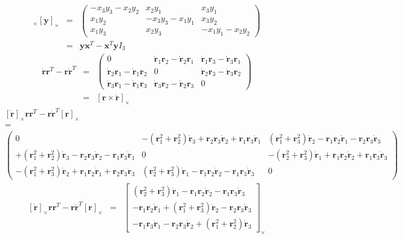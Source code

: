 \documentclass {article}
\newcommand\rot{\mathbf{r}}
\newcommand\x{\mathbf{x}}
\newcommand\y{\mathbf{y}}
\newcommand\rcross{[\rot]_{\times}}
\newcommand\xcross{[\mathbf{x}]_{\times}}
\newcommand\ycross{[\mathbf{y}]_{\times}}
\newcommand\rdotcross{\left[\dot{\rot}\right]_{\times}}
\begin{document}
\begin{eqnarray}
\xcross \ycross &=&
\left(\begin{array}{ccc}
-x_3y_3 - x_2y_2 & x_2y_1 & x_3y_1\\
x_1y_2 & -x_3y_3-x_1y_1 & x_3y_2 \\
x_1y_3 & x_2y_3 & -x_1y_1 - x_2y_2
\end{array}\right)\\
\label{eq:xcrossycross}
&=& \y\x^T-\x^T\y I_3
\end{eqnarray}
\begin{eqnarray}
\dot{\rot}\rot^T-\rot\dot{\rot}^T &=&
\left(\begin{array}{ccc}
0 & \dot{\rot}_1\rot_2 - \dot{\rot}_2\rot_1 & \dot{\rot}_1\rot_3 - \dot{\rot}_3\rot_1\\
\dot{\rot}_2\rot_1 - \dot{\rot}_1\rot_2 & 0 & \dot{\rot}_2\rot_3 - \dot{\rot}_3\rot_2\\
\dot{\rot}_3\rot_1 - \dot{\rot}_1\rot_3 & \dot{\rot}_3\rot_2 - \dot{\rot}_2\rot_3 & 0\end{array}\right)\\
\label{eq:dotrrT-rdotrT}
&=& \left[\rot\times\dot{\rot}\right]_{\times}
\end{eqnarray}
{\tiny
\begin{eqnarray*}
&\rdotcross\rot\rot^T-\rot\dot{\rot}^T\rcross&\\
&=&\\
&\left(\begin{array}{ccc}
0&-(\rot_1^2+\rot_2^2)\dot{\rot}_3+\rot_2\rot_3\dot{\rot}_2+\rot_1\rot_3\dot{\rot}_1 & (\rot_1^2+\rot_3^2)\dot{\rot}_2-\rot_1\rot_2\dot{\rot}_1-\rot_2\rot_3\dot{\rot}_3\\
+(\rot_1^2+\rot_2^2)\dot{\rot}_3-\rot_2\rot_3\dot{\rot}_2-\rot_1\rot_3\dot{\rot}_1 & 0 & -(\rot_2^2+\rot_3^2)\dot{\rot}_1+\rot_1\rot_2\dot{\rot}_2+\rot_1\rot_3\dot{\rot}_3\\
-(\rot_1^2+\rot_3^2)\dot{\rot}_2+\rot_1\rot_2\dot{\rot}_1+\rot_2\rot_3\dot{\rot}_3 & (\rot_2^2+\rot_3^2)\dot{\rot}_1-\rot_1\rot_2\dot{\rot}_2-\rot_1\rot_3\dot{\rot}_3 & 0
\end{array}\right)&
\end{eqnarray*}
}
\begin{eqnarray*}
\rdotcross\rot\rot^T-\rot\dot{\rot}^T\rcross&=&
\left[\begin{array}{c}
(\rot_2^2+\rot_3^2)\dot{\rot}_1-\rot_1\rot_2\dot{\rot}_2-\rot_1\rot_3\dot{\rot}_3\\
-\rot_1\rot_2\dot{\rot}_1+(\rot_1^2+\rot_3^2)\dot{\rot}_2-\rot_2\rot_3\dot{\rot}_3\\
-\rot_1\rot_3\dot{\rot}_1-\rot_2\rot_3\dot{\rot}_2+(\rot_1^2+\rot_2^2)\dot{\rot}_3\end{array}\right]_{\times}
\end{eqnarray*}
\end{document}

